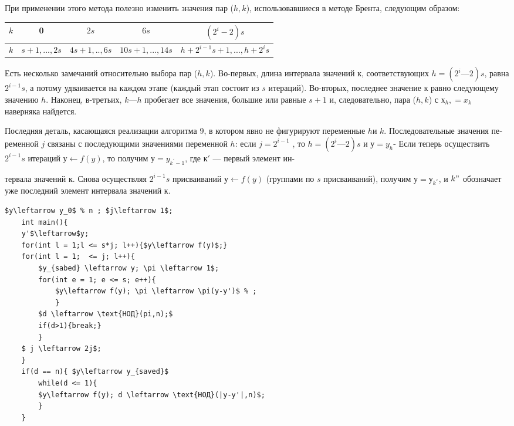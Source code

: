 	При применении этого метода полезно изменить значения пар ($h, k$),	использовавшиеся в методе Брента, следующим образом:	
	
	\begin{table}[h!]
		\centering
		\label{my-label}
		\begin{tabular}{|c|c|c|c|c|}
			$k$ & 0            & $2s$             & $6s$                & $(2^i-2)s$                         \\ \hline
			$k$ & $s+1,...,2s$ & $4s + 1,.. , 6s$ & $10s + 1 ,..., 14s$ & $h + 2^{ i-1}s + 1 ,..., h + 2^is$
		\end{tabular}
	\end{table}

	Есть несколько замечаний относительно выбора пар ($h, k$). Во-первых, длина интервала значений $к$, соответствующих $h = (2^i — 2)s$, равна	$2^{i-1}s$, а потому удваивается на каждом этапе (каждый этап состоит	из $s$ итераций). Во-вторых, последнее значение $к$ равно следующему	значению $h$. Наконец, в-третьих, $k — h$ пробегает все значения, большие  или равные $s + 1$ и, следовательно, пара ($h,k$) с $х_h, = x_k$ наверняка	найдется.
	
	Последняя деталь, касающаяся реализации алгоритма 9, в котором	явно не фигурируют переменные $h$и $k$. Последовательные значения пе­ременной $j$ связаны с последующими значениями переменной $h$: если	$j = 2^{i-1}$ , то $h = (2^i — 2)s$ и $у = y_h$- Если теперь осуществить $2^{i-1}s$ итераций $у \leftarrow f(y)$, то получим $у = y_{k^{'}-1}$, где $к'$ — первый элемент ин-
	
	\pagebreak
	\noindent
	тервала значений $к$. Снова осуществляя $2^{i-1}s$ присваиваний $у \leftarrow f(y)$ (группами по $s$ присваиваний), получим $у = у_{k^{''}}$, и $k"$ обозначает уже	последний элемент интервала значений $к$.

	
	\begin{lstlisting}[mathescape=true,caption=Оптимизированный $\rho$-метод Полларда]
	$y\leftarrow y_0$ % n ; $j\leftarrow 1$;
	int main(){
	y'$\leftarrow$y;
	for(int l = 1;l <= s*j; l++){$y\leftarrow f(y)$;}
	for(int l = 1;  <= j; l++){
		$y_{sabed} \leftarrow y; \pi \leftarrow 1$;
		for(int e = 1; e <= s; e++){
			$y\leftarrow f(y); \pi \leftarrow \pi(y-y')$ % ;		
			}
		$d \leftarrow \text{НОД}(pi,n);$
		if(d>1){break;}		
		}
	$ j \leftarrow 2j$;	
	}
	if(d == n){ $y\leftarrow y_{saved}$
		while(d <= 1){
		$y\leftarrow f(y); d \leftarrow \text{НОД}(|y-y'|,n)$;
		}
	}
	
	\end{lstlisting}
	
